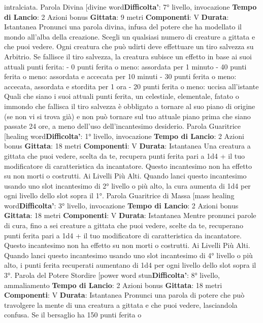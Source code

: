 \begin{multicols}{2}
intralciata.
Parola Divina
[divine word\textbf{Difficolta'}:
7° livello, invocazione
\textbf{Tempo di Lancio}: 2 Azioni bonus
\textbf{Gittata}: 9 metri
\textbf{Componenti}: V
\textbf{Durata}: Istantanea
Pronunci una parola divina, infusa del potere che ha
modellato il mondo all’alba della creazione. Scegli un
qualsiasi numero di creature a gittata e che puoi
vedere. Ogni creatura che può udirti deve effettuare un
tiro salvezza su Arbitrio. Se fallisce il tiro salvezza, la
creatura subisce un effetto in base ai suoi attuali punti
ferita:
- 0 punti ferita o meno: assordata per 1 minuto
- 40 punti ferita o meno: assordata e accecata per 10
minuti
- 30 punti ferita o meno: accecata, assordata e
stordita per 1 ora
- 20 punti ferita o meno: uccisa all’istante
Quali che siano i suoi attuali punti ferita, un celestiale,
elementale, fatato o immondo che fallisca il tiro
salvezza è obbligato a tornare al suo piano di origine
(se non vi si trova già) e non può tornare sul tuo attuale
piano prima che siano passate 24 ore, a meno dell’uso
dell’incantesimo desiderio.
Parola Guaritrice
[healing word\textbf{Difficolta'}:
1° livello, invocazione
\textbf{Tempo di Lancio}: 2 Azioni bonus
\textbf{Gittata}: 18 metri
\textbf{Componenti}: V
\textbf{Durata}: Istantanea
Una creatura a gittata che puoi vedere, scelta da te,
recupera punti ferita pari a 1d4 + il tuo modificatore di
caratteristica da incantatore. Questo incantesimo non
ha effetto su non morti o costrutti.
Ai Livelli Più Alti. Quando lanci questo incantesimo
usando uno slot incantesimo di 2° livello o più alto, la
cura aumenta di 1d4 per ogni livello dello slot sopra il
1°.
Parola Guaritrice di Massa
[mass healing word\textbf{Difficolta'}:
3° livello, invocazione
\textbf{Tempo di Lancio}: 2 Azioni bonus
\textbf{Gittata}: 18 metri
\textbf{Componenti}: V
\textbf{Durata}: Istantanea
Mentre pronunci parole di cura, fino a sei creature a
gittata che puoi vedere, scelte da te, recuperano punti
ferita pari a 1d4 + il tuo modificatore di caratteristica da
incantatore. Questo incantesimo non ha effetto su non
morti o costrutti.
Ai Livelli Più Alti. Quando lanci questo incantesimo
usando uno slot incantesimo di 4° livello o più alto, i
punti ferita recuperati aumentano di 1d4 per ogni livello
dello slot sopra il 3°.
Parola del Potere Stordire
[power word stun\textbf{Difficolta'}:
8° livello, ammaliamento
\textbf{Tempo di Lancio}: 2 Azioni bonus
\textbf{Gittata}: 18 metri
\textbf{Componenti}: V
\textbf{Durata}: Istantanea
Pronunci una parola di potere che può travolgere la
mente di una creatura a gittata e che puoi vedere,
lasciandola confusa. Se il bersaglio ha 150 punti ferita o

\end{multicols}
